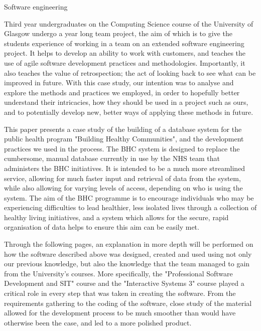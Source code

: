 \documentclass{l3proj}
\begin{document}
Software engineering

Third year undergraduates on the Computing Science course of the University of Glasgow undergo a year long team project, the aim of which is to give the students experience of working in a team on an extended software engineering project. It helps to develop an ability to work with customers, and teaches the use of agile software development practices and methodologies. Importantly, it also teaches the value of retrospection; the act of looking back to see what can be improved in future. With this case study, our intention was to analyse and explore the methods and practices we employed, in order to hopefully better understand their intricacies, how they should be used in a project such as ours, and to potentially develop new, better ways of applying these methods in future.

This paper presents a case study of the building of a database system for the public health program "Building Healthy Communities", and the development practices we used in the process. The BHC system is designed to replace the cumbersome, manual database currently in use by the NHS team that administers the BHC initiatives. It is intended to be a much more streamlined service, allowing for much faster input and retrieval of data from the system, while also allowing for varying levels of access, depending on who is using the system. The aim of the BHC programme is to encourage individuals who may be experiencing difficulties to lead healthier, less isolated lives through a collection of healthy living initiatives, and a system which allows for the secure, rapid organisation of data helps to ensure this aim can be easily met.

Through the following pages, an explanation in more depth will be performed on how the software described above was designed, created and used using not only our previous knowledge, but also the knowledge that the team managed to gain from the University's courses. More specifically, the "Professional Software Development and SIT" course and the "Interactive Systems 3" course played a critical role in every step that was taken in creating the software. From the requirements gathering to the coding of the software, close study of the material allowed for the development process to be much smoother than would have otherwise been the case, and led to a more polished product.

\end{document}
